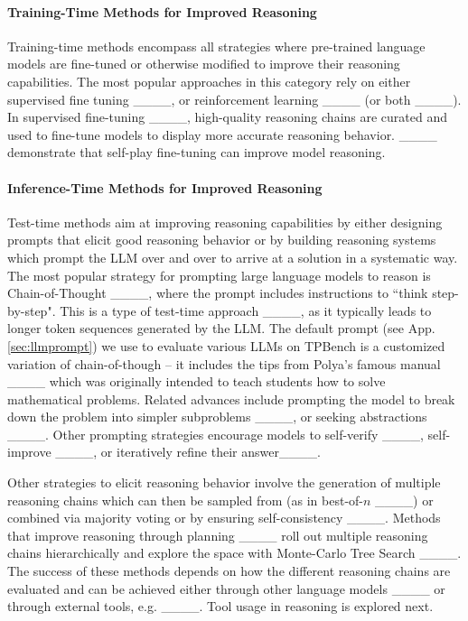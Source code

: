 \paragraph{Training-Time Methods for Improved Reasoning}
Training-time methods encompass all strategies where pre-trained language models are fine-tuned or otherwise modified to improve their reasoning capabilities. The most popular approaches in this category rely on either supervised fine tuning ____, or reinforcement learning ____ (or both ____).
In supervised fine-tuning ____, high-quality reasoning chains are curated and used to fine-tune models to display more accurate reasoning behavior. ____ demonstrate that self-play fine-tuning can improve model reasoning. 

\paragraph{Inference-Time Methods for Improved Reasoning}
Test-time methods aim at improving reasoning capabilities by either designing prompts that elicit good reasoning behavior or by building reasoning systems which prompt the LLM over and over to arrive at a solution in a systematic way. The most popular strategy for prompting large language models to reason is Chain-of-Thought ____, where the prompt includes instructions to ``think step-by-step". This is a type of test-time approach ____, as it typically leads to longer token sequences generated by the LLM. The default prompt (see App. \ref{sec:llmprompt}) we use to evaluate various LLMs on TPBench is a customized variation of chain-of-though -- it includes the tips from Polya's famous manual  ____ which was originally intended to teach students how to solve mathematical problems. Related advances include prompting the model to break down the problem into simpler subproblems ____, or seeking abstractions ____. Other prompting strategies encourage models to self-verify ____, self-improve ____, or iteratively refine their answer____.

Other strategies to elicit reasoning behavior involve the generation of multiple reasoning chains which can then be sampled from (as in best-of-$n$ ____) or combined via majority voting or by ensuring self-consistency ____. Methods that improve reasoning through planning ____ roll out multiple reasoning chains hierarchically and explore the space with Monte-Carlo Tree Search ____. The success of these methods depends on how the different reasoning chains are evaluated and can be achieved either through other language models ____ or through external tools, e.g. ____. Tool usage in reasoning is explored next.

